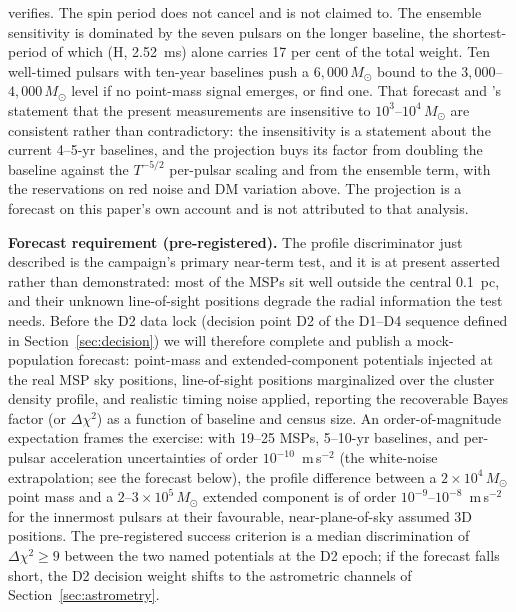 \documentclass[11pt]{article}
\newcommand{\msun}{\ensuremath{M_\odot}}
\begin{document}
verifies. The spin period does not cancel and is not claimed to. The ensemble sensitivity is dominated by the seven pulsars on the longer baseline, the shortest-period of which (H, 2.52~ms) alone carries 17 per cent of the total weight. Ten well-timed pulsars with ten-year baselines push a $6{,}000\,\msun$ bound to the $3{,}000$--$4{,}000\,\msun$ level if no point-mass signal emerges, or find one. That forecast and \citet{ColomiBernadich2026}'s statement that the present measurements are insensitive to $10^{3}$--$10^{4}\,\msun$ are consistent rather than contradictory: the insensitivity is a statement about the current 4--5-yr baselines, and the projection buys its factor from doubling the baseline against the $T^{-5/2}$ per-pulsar scaling and from the ensemble term, with the reservations on red noise and DM variation above. The projection is a forecast on this paper's own account and is not attributed to that analysis.

\textbf{Forecast requirement (pre-registered).} The profile discriminator just described is the campaign's primary near-term test, and it is at present asserted rather than demonstrated: most of the MSPs sit well outside the central 0.1~pc, and their unknown line-of-sight positions degrade the radial information the test needs. Before the D2 data lock (decision point D2 of the D1--D4 sequence defined in Section~\ref{sec:decision}) we will therefore complete and publish a mock-population forecast: point-mass and extended-component potentials injected at the real MSP sky positions, line-of-sight positions marginalized over the cluster density profile, and realistic timing noise applied, reporting the recoverable Bayes factor (or $\Delta\chi^{2}$) as a function of baseline and census size. An order-of-magnitude expectation frames the exercise: with 19--25 MSPs, 5--10-yr baselines, and per-pulsar acceleration uncertainties of order $10^{-10}$~m\,s$^{-2}$ (the white-noise extrapolation; see the forecast below), the profile difference between a $2\times10^{4}\,\msun$ point mass and a $2$--$3\times10^{5}\,\msun$ extended component is of order $10^{-9}$--$10^{-8}$~m\,s$^{-2}$ for the innermost pulsars at their favourable, near-plane-of-sky assumed 3D positions. The pre-registered success criterion is a median discrimination of $\Delta\chi^{2}\geq 9$ between the two named potentials at the D2 epoch; if the forecast falls short, the D2 decision weight shifts to the astrometric channels of Section~\ref{sec:astrometry}.
\end{document}

